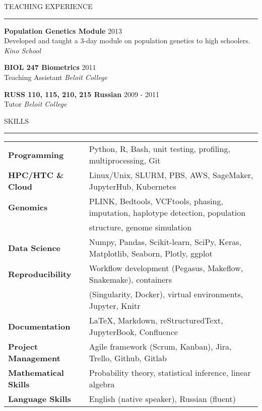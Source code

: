 \documentclass{resume} %
\renewenvironment{rSection}[1]{
\sectionskip
\textcolor{RoyalPurple}{\MakeUppercase{#1}}
\sectionlineskip
\hrule
\begin{list}{}{
\setlength{\leftmargin}{1.5em}
}
\item[]
}{
\end{list}
}
\begin{document}
\begin{rSection}{Teaching Experience}
    {\bf Population Genetics Module} \hfill 2013\\
    Developed and taught a 3-day module on population genetics to high schoolers. \hspace*{\fill} {\em Kino School}

    {\bf BIOL 247 Biometrics} \hfill 2011\\ 
    Teaching Assistant \hspace*{\fill} {\em Beloit College}

    {\bf RUSS 110, 115, 210, 215 Russian} \hfill 2009 - 2011 \\ 
    Tutor \hspace*{\fill} {\em Beloit College}

\end{rSection}


\begin{rSection}{Skills}

    \begin{tabular}{ @{} >{\bfseries}l @{\hspace{6ex}} l }
    Programming & Python, R, Bash, unit testing, profiling, multiprocessing, Git\\
    HPC/HTC \& Cloud & Linux/Unix, SLURM, PBS, AWS, SageMaker, JupyterHub, Kubernetes  \\
    Genomics & PLINK, Bedtools, VCFtools, phasing, imputation, haplotype detection, population \\ & structure, genome simulation\\
    Data Science & Numpy, Pandas, Scikit-learn, SciPy, Keras, Matplotlib, Seaborn, Plotly, ggplot \\
    Reproducibility & Workflow development (Pegasus, Makeflow, Snakemake), containers \\ & (Singularity, Docker), virtual environments, Jupyter, Knitr \\
    Documentation & \LaTeX, Markdown, reStructuredText, JupyterBook, Confluence \\
    Project Management & Agile framework (Scrum, Kanban), Jira, Trello, Github, Gitlab \\
    Mathematical Skills & Probability theory, statistical inference, linear algebra \\
    Language Skills & English (native speaker), Russian (fluent)
    \end{tabular}
    
\end{rSection}
\end{document}
